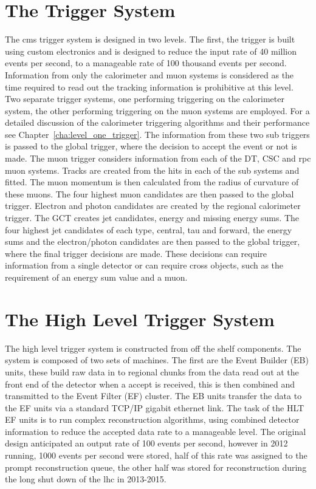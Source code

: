 \section{The \Lone Trigger System} %
\label{sec:the_level_one_trigger_system}
The \ac{cms} trigger system is designed in two levels. The first, the \Lone
trigger is built using custom electronics and is designed to reduce the input
rate of 40 million events per second, to a manageable rate of 100 thousand
events per second. Information from only the calorimeter and muon systems is
considered as the time required to read out the tracking information is
prohibitive at this level. Two separate trigger systems, one performing
triggering on the calorimeter system, the other performing triggering on the
muon systems are employed. For a detailed discussion of the calorimeter
triggering algorithms and their performance see
Chapter~\ref{cha:level_one_trigger}. The information from these two sub
triggers is passed to the global trigger, where the decision to accept the
event or not is made.
The muon trigger considers information from each of the DT, CSC and \ac{rpc}
muon systems. Tracks are created from the hits in each of the sub systems and
fitted. The muon momentum is then calculated from the radius of curvature of
these muons. The four highest \PT muon candidates are then passed to the global
trigger.
Electron and photon candidates are created by the regional calorimeter trigger.
The GCT creates jet candidates, energy and missing energy sums. The four
highest \ET jet candidates of each type, central, tau and forward, the energy
sums and the electron/photon candidates are then passed to the global trigger,
where the final trigger decisions are made. These decisions can require
information from a single detector or can require cross objects, such as the
requirement of an energy sum value and a muon.

\section{The High Level Trigger System} %
\label{sec:the_high_level_trigger_system}
The high level trigger system is constructed from off the shelf components.
The system is composed of two sets of machines. The first are the Event Builder
(EB) units, these build raw data in to regional chunks from the data read out
at the front end of the detector when a \Lone accept is received, this is then 
combined and transmitted to the Event Filter (EF) cluster. The EB units 
transfer the data to the EF units via a standard TCP/IP gigabit ethernet link.
The task of the HLT EF units is to run complex reconstruction algorithms, using
combined detector information to reduce the accepted data rate to a manageable 
level. The original design anticipated an output rate of 100 events per second, 
however in 2012 running, 1000 events per second were stored, half of this rate 
was assigned to the prompt reconstruction queue, the other half was stored for 
reconstruction during the long shut down of the \ac{lhc} in 2013-2015.

